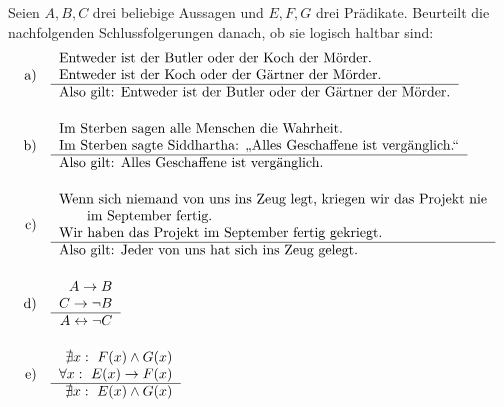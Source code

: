 \begin{aufg}
    Seien $A,B,C$ drei beliebige Aussagen und $E,F,G$ drei Prädikate. Beurteilt die nachfolgenden Schlussfolgerungen danach, ob sie logisch haltbar sind:
    \begin{align*}
        \text{a)}\quad &\begin{tabular}{l}
            Entweder ist der Butler oder der Koch der Mörder. \\
            Entweder ist der Koch oder der Gärtner der Mörder. \\ \hline
            Also gilt: Entweder ist der Butler oder der Gärtner der Mörder.
        \end{tabular} \\[1em]
        \text{b)}\quad &\begin{tabular}{l}
            Im Sterben sagen alle Menschen die Wahrheit. \\
            Im Sterben sagte Siddhartha: „Alles Geschaffene ist vergänglich.“ \\ \hline
            Also gilt: Alles Geschaffene ist vergänglich.
        \end{tabular} \\[1em]
        \text{c)}\quad &\begin{tabular}{l}
            Wenn sich niemand von uns ins Zeug legt, kriegen wir das Projekt nie \\
            \qquad im September fertig. \\
            Wir haben das Projekt im September fertig gekriegt. \\ \hline
            Also gilt: Jeder von uns hat sich ins Zeug gelegt.
        \end{tabular} \\[1em]
        \text{d)}\quad &\begin{tabular}{r}
            $A\to B$ \\
            $C\to \neg B$ \\ \hline
            $A\leftrightarrow \neg C$
        \end{tabular} \\[1em]
        \text{e)}\quad &\begin{tabular}{r}
            $\nexists x:\ F(x)\land G(x)$ \\
            $\forall x:\ E(x)\to F(x)$ \\ \hline 
            $\nexists x:\ E(x)\land G(x)$
        \end{tabular}
    \end{align*}
\end{aufg}



